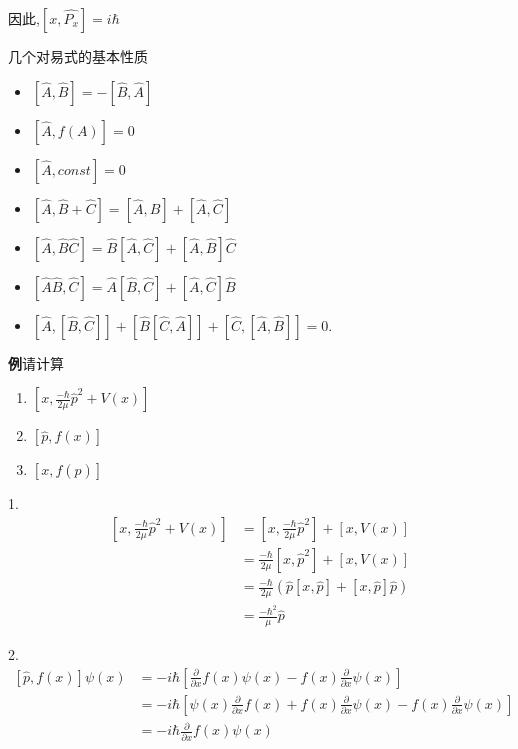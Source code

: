 \documentclass[lang=cn,10pt]{elegantbook}
\begin{document}
因此,$[x,\hat{P_x}]=i\hbar$

几个对易式的基本性质
\begin{itemize}
	\item $[ \hat{A} ,\hat{B} ]=- [ \hat{B} ,\hat{A} ]$
	\item $[\hat{A},f(A)]=0$
	\item $[\hat{A},const]=0$
	\item $[\hat{A},\hat{B}+\hat{C}]=[\hat{A},\hat{B}]+[\hat{A},\hat{C}]$
	\item $[ \hat{A} ,\hat{B}\hat{C} ]=\hat{B}[ \hat{A} ,\hat{C} ]+[ \hat{A} ,\hat{B} ] \hat{C} $
	\item $[\hat{A}\hat{B},\hat{C}]=\hat{A}[\hat{B},\hat{C}]+[\hat{A},\hat{C}]\hat{B}$
	\item $[\hat{A},[\hat{B},\hat{C}]]+[\hat{B}[\hat{C},\hat{A}]]+[\hat{C},[\hat{A},\hat{B}]]=0.$
\end{itemize}

\textbf{例}请计算
\begin{enumerate}
	\item $[x,\frac{-\hbar}{2\mu}\hat{p}^{2}+V(x)]$
	\item $[\hat{p},f(x)]$
	\item $[x,f(\hat{p})]$
\end{enumerate}

1.\begin{equation*}
	\begin{split}
		[x,\frac{-\hbar}{2\mu}\hat{p}^2+V(x)]&=[x,\frac{-\hbar}{2\mu}\hat{p}^2]+[x,V(x)]
		\\
		&=\frac{-\hbar}{2\mu}[x,\hat{p}^2]+[x,V(x)]
		\\
		&=\frac{-\hbar}{2\mu}\left( \hat{p}[x,\hat{p}]+[x,\hat{p}]\hat{p} \right) 
		\\
		&=\frac{-\hbar ^2}{\mu}\hat{p}
	\end{split}
\end{equation*}

2.\begin{equation*}
	\begin{split}
		[\hat{p},f(x)]\psi \left( x \right) &=-i\hbar \left[ \frac{\partial}{\partial x}f\left( x \right) \psi \left( x \right) -f\left( x \right) \frac{\partial}{\partial x}\psi \left( x \right) \right] 
		\\
		&=-i\hbar \left[ \psi \left( x \right) \frac{\partial}{\partial x}f\left( x \right) +f\left( x \right) \frac{\partial}{\partial x}\psi \left( x \right) -f\left( x \right) \frac{\partial}{\partial x}\psi \left( x \right) \right] 
		\\
		&=-i\hbar \frac{\partial}{\partial x}f\left( x \right) \psi \left( x \right)
	\end{split}
\end{equation*}
\end{document}
